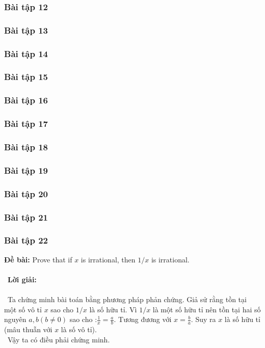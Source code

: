 \documentclass[a4paper]{article}
\begin{document}
\clearpage
\subsubsection{Bài tập 12}

\clearpage
\subsubsection{Bài tập 13}

\clearpage
\subsubsection{Bài tập 14}

\clearpage
\subsubsection{Bài tập 15}

\clearpage
\subsubsection{Bài tập 16}

\clearpage
\subsubsection{Bài tập 17}

\clearpage
\subsubsection{Bài tập 18}

\clearpage
\subsubsection{Bài tập 19}

\clearpage
\subsubsection{Bài tập 20}

\clearpage
\subsubsection{Bài tập 21}

\clearpage
\subsubsection{Bài tập 22}
\textbf{Đề bài: }Prove that if $x$ is irrational, then $1/x$ is irrational. \\\ \\\
\textbf{Lời giải:} \\\ \\\
Ta chứng minh bài toán bằng phương pháp phản chứng. Giả sử rằng tồn tại một số vô tỉ $x$ sao cho $1/x$ là số hữu tỉ. Vì $1/x$ là một số hữu tỉ nên tồn tại hai số nguyên $a,b (b \neq 0)$ sao cho :$\frac{1}{x} = \frac{a}{b}.$ Tương đương với $x = \frac{b}{a}$. Suy ra $x$ là số hữu tỉ (mâu thuẫn với $x$ là số vô tỉ). \\\
Vậy ta có điều phải chứng minh.
\clearpage
\end{document}
